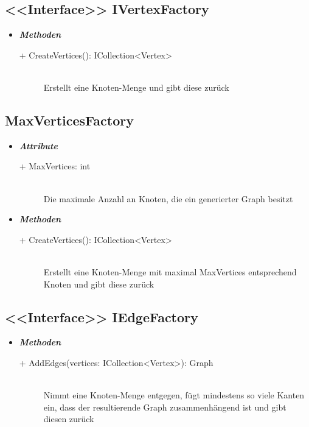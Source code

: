 \documentclass[13pt]{scrreprt}
\begin{document}
	\subsection{<<Interface>> IVertexFactory}
	\begin{itemize}[label = {$\circ$}]
		\item {\large \textbf{\textit{Methoden}}\par}
		\begin{description}
			\item [+ CreateVertices(): ICollection<Vertex>] \hfill \\ Erstellt eine Knoten-Menge und gibt diese zurück
		\end{description}
	\end{itemize}
	
	\subsection{MaxVerticesFactory}
	\begin{itemize}[label = {$\circ$}]
		\item {\large \textbf{\textit{Attribute}}\par}
		\begin{description}
			\item [+ MaxVertices: int] \hfill \\ Die maximale Anzahl an Knoten, die ein generierter Graph besitzt
		\end{description}	
		\item {\large \textbf{\textit{Methoden}}\par}
		\begin{description}
			\item [+ CreateVertices(): ICollection<Vertex>] \hfill \\ Erstellt eine Knoten-Menge mit maximal MaxVertices entsprechend Knoten und gibt diese zurück
		\end{description}
	\end{itemize}
	\newpage
	\subsection{<<Interface>> IEdgeFactory}
	\begin{itemize}[label = {$\circ$}]
		\item {\large \textbf{\textit{Methoden}}\par}
		\begin{description}
			\item [+ AddEdges(vertices: ICollection<Vertex>): Graph] \hfill \\ Nimmt eine Knoten-Menge entgegen, fügt mindestens so viele Kanten ein, dass der resultierende Graph zusammenhängend ist und gibt diesen zurück
		\end{description}
	\end{itemize}
	
\end{document}
